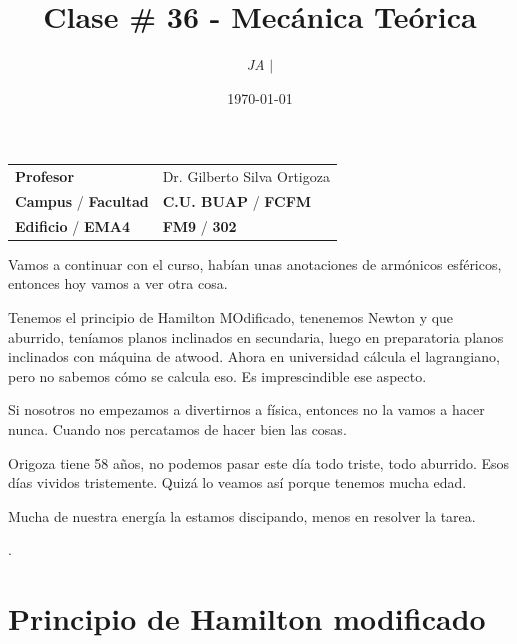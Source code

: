 \documentclass{article}
\title{Clase \# 36 - Mecánica Teórica}
\author{\emph{JA} $\boldsymbol{\mid}$}
\date{\today}
\begin{document}
\maketitle



\begin{mybox}
\noindent\begin{tabular}{@{}ll}
	{\bfseries{Profesor}} & Dr. Gilberto Silva Ortigoza\\
	\textcolor{prussianblue}{\bfseries{Campus}} / \textcolor{trueblue}{\bfseries{Facultad}}  & \textcolor{prussianblue}{\bfseries{C.U. BUAP}} /  \textcolor{trueblue}{\bfseries{FCFM}} \\
	\textcolor{prussianblue}{\bfseries{Edificio}} /  \textcolor{trueblue}{\bfseries{EMA4}}    & 	\textcolor{prussianblue}{\bfseries{FM9}} /  \textcolor{trueblue}{\bfseries{302}}   
\end{tabular} 
\end{mybox} \vspace{1cm}

\tableofcontents

\vspace{2cm}

Vamos a continuar con el curso, habían unas anotaciones de armónicos esféricos, entonces hoy vamos a ver otra cosa.


Tenemos el principio de Hamilton MOdificado, tenenemos Newton y que aburrido, teníamos planos inclinados en secundaria, luego en preparatoria planos inclinados con máquina de atwood. Ahora en universidad cálcula el lagrangiano, pero no sabemos cómo se calcula eso. Es imprescindible ese aspecto.

Si nosotros no empezamos a divertirnos a física, entonces no la vamos a hacer nunca. Cuando nos percatamos de hacer bien las cosas. 

Origoza tiene 58 años, no podemos pasar este día todo triste, todo aburrido. Esos días vividos tristemente. Quizá lo veamos así porque tenemos mucha edad.

Mucha de nuestra energía la estamos discipando, menos en resolver la tarea.

. 


\section{Principio de Hamilton modificado}
\end{document}
